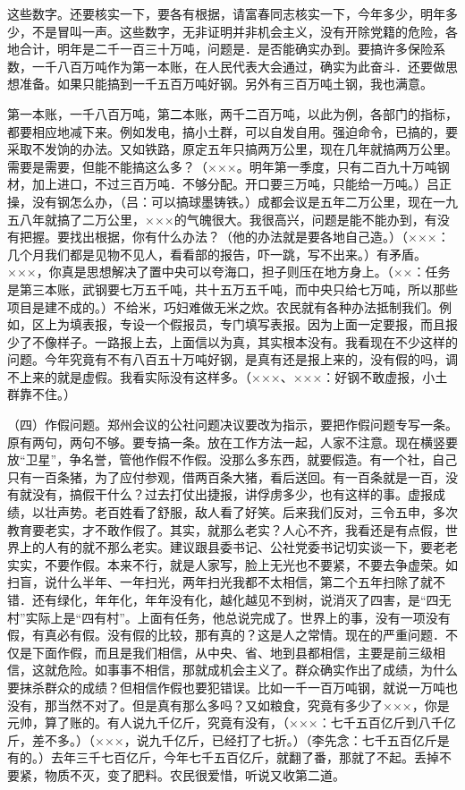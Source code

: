 这些数字。还要核实一下，要各有根据，请富春同志核实一下，今年多少，明年多少，不是冒叫一声。这些数字，无非证明并非机会主义，没有开除党籍的危险，各地合计，明年是二千一百三十万吨，问题是．是否能确实办到。要搞许多保险系数，一千八百万吨作为第一本账，在人民代表大会通过，确实为此奋斗．还要做思想准备。如果只能搞到一千五百万吨好钢。另外有三百万吨土钢，我也满意。

第一本账，一千八百万吨，第二本账，两千二百万吨，以此为例，各部门的指标，都要相应地减下来。例如发电，搞小土群，可以自发自用。强迫命令，已搞的，要采取不发饷的办法。又如铁路，原定五年只搞两万公里，现在几年就搞两万公里。需要是需要，但能不能搞这么多？（×××。明年第一季度，只有二百九十万吨钢材，加上进口，不过三百万吨．不够分配。开口要三万吨，只能给一万吨。）吕正操，没有钢怎么办，（吕：可以搞球墨铸铁。）成都会议是五年二万公里，现在一九五八年就搞了二万公里，×××的气魄很大。我很高兴，问题是能不能办到，有没有把握。要找出根据，你有什么办法？（他的办法就是要各地自己造。）（×××：几个月我们都是见物不见人，看看部的报告，吓一跳，写不出来。）有矛盾。×××，你真是思想解决了置中央可以夸海口，担子则压在地方身上。（××：任务是第三本账，武钢要七万五千吨，共十五万五千吨，而中央只给七万吨，所以那些项目是建不成的。）不给米，巧妇难做无米之炊。农民就有各种办法抵制我们。例如，区上为填表报，专设一个假报员，专门填写表报。因为上面一定要报，而且报少了不像样子。一路报上去，上面信以为真，其实根本没有。我看现在不少这样的问题。今年究竟有不有八百五十万吨好钢，是真有还是报上来的，没有假的吗，调不上来的就是虚假。我看实际没有这样多。（×××、×××：好钢不敢虚报，小土群靠不住。）

（四）作假问题。郑州会议的公社问题决议要改为指示，要把作假问题专写一条。原有两句，两句不够。要专搞一条。放在工作方法一起，人家不注意。现在横竖要放“卫星”，争名誉，管他作假不作假。没那么多东西，就要假造。有一个社，自己只有一百条猪，为了应付参观，借两百条大猪，看后送回。有一百条就是一百，没有就没有，搞假干什么？过去打仗出捷报，讲俘虏多少，也有这样的事。虚报成绩，以壮声势。老百姓看了舒服，敌人看了好笑。后来我们反对，三令五申，多次教育要老实，才不敢作假了。其实，就那么老实？人心不齐，我看还是有点假，世界上的人有的就不那么老实。建议跟县委书记、公社党委书记切实谈一下，要老老实实，不要作假。本来不行，就是人家写，脸上无光也不要紧，不要去争虚荣。如扫盲，说什么半年、一年扫光，两年扫光我都不太相信，第二个五年扫除了就不错．还有绿化，年年化，年年没有化，越化越见不到树，说消灭了四害，是“四无村”实际上是“四有村”。上面有任务，他总说完成了。世界上的事，没有一项没有假，有真必有假。没有假的比较，那有真的？这是人之常情。现在的严重问题．不仅是下面作假，而且是我们相信，从中央、省、地到县都相信，主要是前三级相信，这就危险。如事事不相信，那就成机会主义了。群众确实作出了成绩，为什么要抹杀群众的成绩？但相信作假也要犯错误。比如一千一百万吨钢，就说一万吨也没有，那当然不对了。但是真有那么多吗？又如粮食，究竟有多少了×××，你是元帅，算了账的。有人说九千亿斤，究竟有没有，（×××：七千五百亿斤到八千亿斤，差不多。）（×××，说九千亿斤，已经打了七折。）（李先念：七千五百亿斤是有的。）去年三千七百亿斤，今年七千五百亿斤，就翻了番，那就了不起。丢掉不要紧，物质不灭，变了肥料。农民很爱惜，听说又收第二道。

